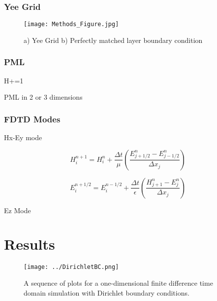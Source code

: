 \documentclass[a4paper]{article}
\begin{document}
\subsubsection{Yee Grid}

\begin{figure}
    \centering
    \texttt{[image: Methods\_Figure.jpg]}
    \caption{a) Yee Grid b) Perfectly matched layer boundary condition}
    \label{fig:YeePML}
\end{figure}

\subsubsection{PML}

\begin{center}
    \colorbox[RGB]{239,240,241}{
    \begin{minipage}{.9\linewidth}
        \begin{algorithmic}[H]
            \State H+=1
            \EndFor
        \end{algorithmic}
    \end{minipage}}
\end{center}

PML in 2 or 3 dimensions

\subsubsection{FDTD Modes}

Hx-Ey mode

\begin{equation}
    H_i^{n+1} = H_i^n + \frac{\Delta t}{\mu} \left( \frac{E_{j+1 \slash 2}^n - E_{j- 1 \slash 2}^n}{\Delta x_j} \right) 
\end{equation}

\begin{equation}
    E_i^{n+1\slash 2} = E_i^{n-1\slash 2} + \frac{\Delta t}{\epsilon} \left( \frac{H_{j+1}^n - E_{j}^n}{\Delta x_j} \right) 
\end{equation}

Ez Mode

\section{Results}

\begin{figure}
    \centering
    \texttt{[image: ../DirichletBC.png]}
    \caption{A sequence of plots for a one-dimensional finite difference time domain simulation with Dirichlet boundary conditions.}
    \label{fig:YeePML}
\end{figure}
\end{document}

